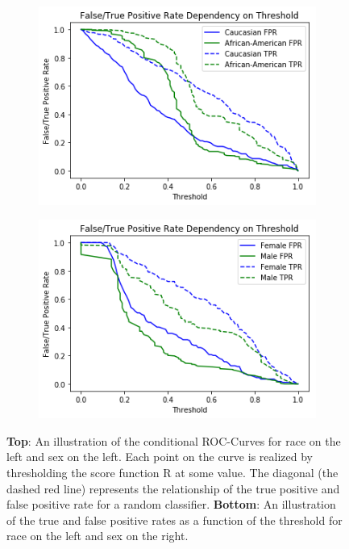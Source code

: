 \documentclass[11pt, fleqn, titlepage]{article}
\begin{document}
\begin{figure}[H]
		\begin{subfigure}{0.5\textwidth}
			\centering
			\includegraphics[width=0.9\linewidth]{imgs/fpr_tpr_plot.png}
		\end{subfigure}%
		\begin{subfigure}{0.5\textwidth}
			\centering
			\includegraphics[width=0.9\linewidth]{imgs/fpr_tpr_plot_sex.png}
		\end{subfigure}
		\caption{\textbf{Top}: An illustration of the conditional ROC-Curves for race on the left and sex on the left. Each point on the curve is realized by thresholding the score function R at some value. The diagonal (the dashed red line) represents the relationship of the true positive and false positive rate for a random classifier. \textbf{Bottom}: An illustration of the true and false positive rates as a function of the threshold for race on the left and sex on the right.}
		\label{fig:roc-curve}
	\end{figure}
\end{document}
